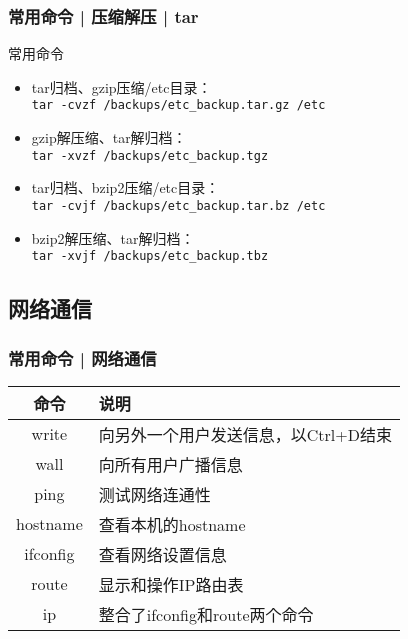 \begin{frame}[fragile]
  \frametitle{常用命令 | 压缩解压 | \alert{tar}}
  \begin{block}{常用命令}
    \begin{itemize}
      \item tar归档、gzip压缩/etc目录：\\ \verb|tar -cvzf /backups/etc_backup.tar.gz /etc|
      \item gzip解压缩、tar解归档：\\ \verb|tar -xvzf /backups/etc_backup.tgz|
      \item tar归档、bzip2压缩/etc目录：\\ \verb|tar -cvjf /backups/etc_backup.tar.bz /etc|
      \item bzip2解压缩、tar解归档：\\ \verb|tar -xvjf /backups/etc_backup.tbz|
    \end{itemize}
  \end{block}
\end{frame}

\subsection{网络通信}
\begin{frame}
  \frametitle{常用命令 | 网络通信}
  \begin{table}
    \centering
    \begin{tabularx}{0.8\textwidth}{cX}
      \hline
      \rowcolor{blue!50}命令 & 说明\\
      \hline
      write & 向另外一个用户发送信息，以Ctrl+D结束\\
      wall & 向所有用户广播信息\\
      ping & 测试网络连通性\\
      hostname & 查看本机的hostname\\
      ifconfig & 查看网络设置信息\\
      route & 显示和操作IP路由表\\
      ip & 整合了ifconfig和route两个命令\\
      \hline
    \end{tabularx}
  \end{table}
\end{frame}


